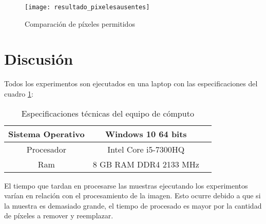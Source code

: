 \begin{figure}[h!]
  \centering  
  \begin{minipage}[b]{1\textwidth}
        \texttt{[image: resultado\_pixelesausentes]}
    \caption{Comparación de píxeles permitidos} 
    \label{Comparación de píxeles permitidos}
  \end{minipage}
\end{figure}

\clearpage
\section{Discusión}
Todos los experimentos son ejecutados en una laptop con las especificaciones del cuadro \ref{tab:Especificaciones técnicas del PC}:

\begin{table}[H]
	{\centering
		\caption{Especificaciones técnicas del equipo de cómputo}
		\begin{tabular}{|c|c|c|}
			\hline
			Sistema Operativo & Windows 10 64 bits\\
			\hline
			Procesador & Intel Core i5-7300HQ\\
			\hline
			Ram & 8 GB RAM DDR4 2133 MHz\\
			\hline
		\end{tabular}

	\label{tab:Especificaciones técnicas del PC}
	}
\end{table}


El tiempo que tardan en procesarse las muestras ejecutando los experimentos varían en relación con el procesamiento de la imagen. Esto ocurre debido a que si la muestra es demasiado grande, el tiempo de procesado es mayor por la cantidad de píxeles a remover y reemplazar. 


